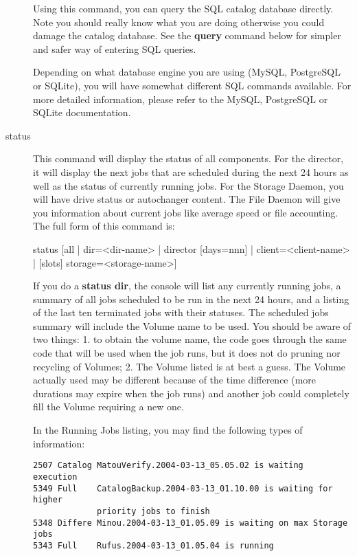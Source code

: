 \begin{description}
   Using this command, you can query the SQL catalog database directly.
   Note you should really know what you are doing otherwise you could
   damage the catalog database.  See the {\bf query} command below for
   simpler and safer way of entering SQL queries.

   Depending on what database engine you are using (MySQL, PostgreSQL or
   SQLite), you will have somewhat different SQL commands available.  For
   more detailed information, please refer to the MySQL, PostgreSQL or
   SQLite documentation.

\item [status]

   This command will display the status of all components. For the director, it
   will display the next jobs that are scheduled during the next 24 hours as
   well as the status of currently running jobs. For the Storage Daemon, you
   will have drive status or autochanger content. The File Daemon will give you
   information about current jobs like average speed or file accounting. The
   full form of this command is:

status [all | dir={\textless}dir-name{\textgreater} | director [days=nnn] |
  client={\textless}client-name{\textgreater} | [slots] storage={\textless}storage-name{\textgreater}]

   If you do a {\bf status dir}, the console will list any currently
   running jobs, a summary of all jobs scheduled to be run in the next 24
   hours, and a listing of the last ten terminated jobs with their statuses.
   The scheduled jobs summary will include the Volume name to be used.  You
   should be aware of two things: 1. to obtain the volume name, the code
   goes through the same code that will be used when the job runs, but it
   does not do pruning nor recycling of Volumes; 2.  The Volume listed is
   at best a guess.  The Volume actually used may be different because of
   the time difference (more durations may expire when the job runs) and
   another job could completely fill the Volume requiring a new one.

   In the Running Jobs listing, you may find the following types of
   information:


\footnotesize
\begin{verbatim}
2507 Catalog MatouVerify.2004-03-13_05.05.02 is waiting execution
5349 Full    CatalogBackup.2004-03-13_01.10.00 is waiting for higher
             priority jobs to finish
5348 Differe Minou.2004-03-13_01.05.09 is waiting on max Storage jobs
5343 Full    Rufus.2004-03-13_01.05.04 is running
\end{verbatim}
\normalsize


\end{description}
